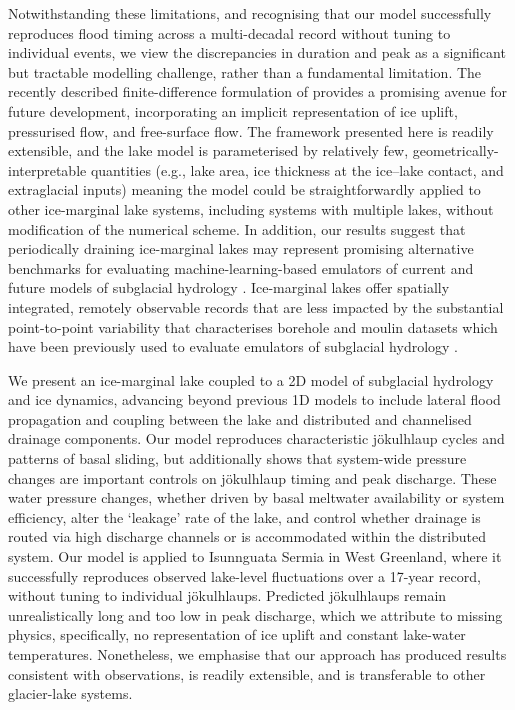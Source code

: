 \documentclass[tc, manuscript]{copernicus}
\begin{document}
Notwithstanding these limitations, and recognising that our model successfully reproduces flood timing across a multi-decadal record without tuning to individual events, we view the discrepancies in duration and peak as a significant but tractable modelling challenge, rather than a fundamental limitation. The recently described finite-difference formulation of \citet{wells2026glads} provides a promising avenue for future development, incorporating an implicit representation of ice uplift, pressurised flow, and free-surface flow. The framework presented here is readily extensible, and the lake model is parameterised by relatively few, geometrically-interpretable quantities (e.g., lake area, ice thickness at the ice--lake contact, and extraglacial inputs) meaning the model could be straightforwardly applied to other ice-marginal lake systems, including systems with multiple lakes, without modification of the numerical scheme. In addition, our results suggest that periodically draining ice-marginal lakes may represent promising alternative benchmarks for evaluating machine-learning-based emulators of current and future models of subglacial hydrology \citep[e.g.,][]{brinkerhoff2021constraining,verjans2024accelerating,hill2025computationally}. Ice-marginal lakes offer spatially integrated, remotely observable records \citep{domgaard2024altimetry,livingstone2025ice} that are less impacted by the substantial point-to-point variability that characterises borehole and moulin datasets \citep{murray1995black,meierbachtol2013basal,rada2018channelized,ing2026connectivity} which have been previously used to evaluate emulators of subglacial hydrology \citep[e.g.,][]{hill2025emulator}.

\conclusions

We present an ice-marginal lake coupled to a 2D model of subglacial hydrology and ice dynamics, advancing beyond previous 1D models to include lateral flood propagation and coupling between the lake and distributed and channelised drainage components. Our model reproduces characteristic jökulhlaup cycles and patterns of basal sliding, but additionally shows that system-wide pressure changes are important controls on jökulhlaup timing and peak discharge. These water pressure changes, whether driven by basal meltwater availability or system efficiency, alter the `leakage' rate of the lake, and control whether drainage is routed via high discharge channels or is accommodated within the distributed system. Our model is applied to Isunnguata Sermia in West Greenland, where it successfully reproduces observed lake-level fluctuations over a 17-year record, without tuning to individual jökulhlaups. Predicted jökulhlaups remain unrealistically long and too low in peak discharge, which we attribute to missing physics, specifically, no representation of ice uplift and constant lake-water temperatures. Nonetheless, we emphasise that our approach has produced results consistent with observations, is readily extensible, and is transferable to other glacier-lake systems.
\end{document}
